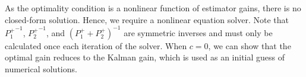 \documentclass[letterpaper, 10pt, conference]{ieeeconf}
\newcommand{\deriv}[2]{\ensuremath{\frac{\partial #1}{\partial #2}}}
\begin{document}


%
%
%


As the optimality condition is a nonlinear function of estimator gains, there is no closed-form solution. Hence, we require a nonlinear equation solver. Note that ${P_1^+}^{-1}$, ${P_2^+}^{-1}$, and $(P^+_1+P^+_2)^{-1}$ are symmetric inverses and must only be calculated once each iteration of the solver. When $c=0$, we can show that the optimal gain reduces to the Kalman gain, which is used as an initial guess of numerical solutions. 



		
		
		
	
	
\end{document}
